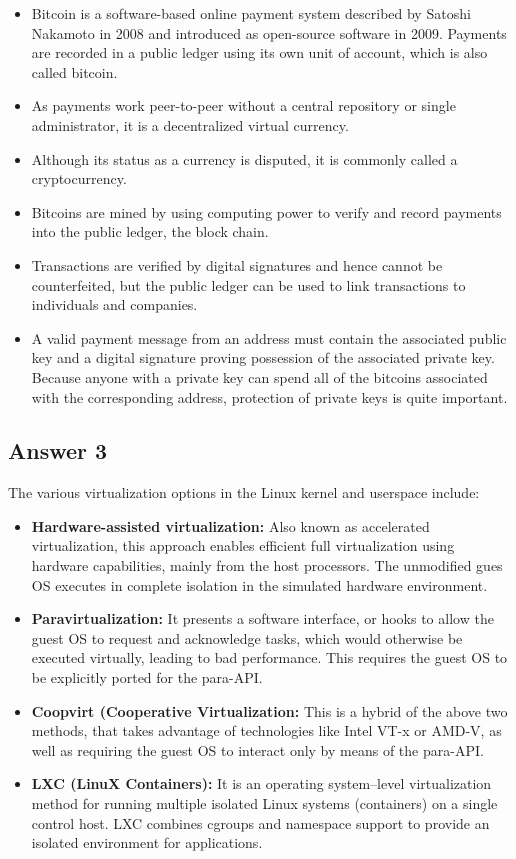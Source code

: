 \documentclass[]{article}
\begin{document}
\begin{itemize}
\itemsep1pt\parskip0pt
\item
  Bitcoin is a software-based online payment system described by Satoshi
  Nakamoto in 2008 and introduced as open-source software in 2009.
  Payments are recorded in a public ledger using its own unit of
  account, which is also called bitcoin.
\item
  As payments work peer-to-peer without a central repository or single
  administrator, it is a decentralized virtual currency.
\item
  Although its status as a currency is disputed, it is commonly called a
  cryptocurrency.
\item
  Bitcoins are mined by using computing power to verify and record
  payments into the public ledger, the block chain.
\item
  Transactions are verified by digital signatures and hence cannot be
  counterfeited, but the public ledger can be used to link transactions
  to individuals and companies.
\item
  A valid payment message from an address must contain the associated
  public key and a digital signature proving possession of the
  associated private key. Because anyone with a private key can spend
  all of the bitcoins associated with the corresponding address,
  protection of private keys is quite important.
\end{itemize}

\subsection{Answer 3}\label{answer-3}

The various virtualization options in the Linux kernel and userspace
include:

\begin{itemize}
\itemsep1pt\parskip0pt
\item
  \textbf{Hardware-assisted virtualization:} Also known as accelerated
  virtualization, this approach enables efficient full virtualization
  using hardware capabilities, mainly from the host processors. The
  unmodified gues OS executes in complete isolation in the simulated
  hardware environment.
\item
  \textbf{Paravirtualization:} It presents a software interface, or
  hooks to allow the guest OS to request and acknowledge tasks, which
  would otherwise be executed virtually, leading to bad performance.
  This requires the guest OS to be explicitly ported for the para-API.
\item
  \textbf{Coopvirt (Cooperative Virtualization:} This is a hybrid of the
  above two methods, that takes advantage of technologies like Intel
  VT-x or AMD-V, as well as requiring the guest OS to interact only by
  means of the para-API.
\item
  \textbf{LXC (LinuX Containers):} It is an operating system--level
  virtualization method for running multiple isolated Linux systems
  (containers) on a single control host. LXC combines cgroups and
  namespace support to provide an isolated environment for applications.
\end{itemize}
\end{document}
